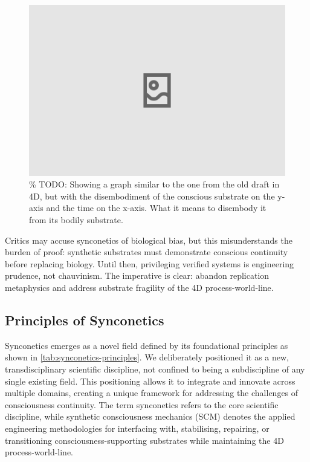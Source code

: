 \documentclass[10pt]{article}
\begin{document}
\begin{sloppypar}
  \begin{figure}[ht!]
    \centering
    \includegraphics[width=\textwidth]{figures/4d-trajectory-disembodiment.png}
    \caption{\% TODO: Showing a graph similar to the one from the old draft in 4D, but with the disembodiment of the conscious substrate on the y-axis and the time on the x-axis. What it means to disembody it from its bodily substrate.}
    \label{fig:4d-trajectory-disembodiment}
  \end{figure}

  Critics may accuse synconetics of biological bias, but this misunderstands the burden of proof: synthetic substrates must demonstrate conscious continuity before replacing biology. Until then, privileging verified systems is engineering prudence, not chauvinism. The imperative is clear: abandon replication metaphysics and address substrate fragility of the 4D process-world-line.

  \subsection{Principles of Synconetics}
  \label{sec:principles}

  Synconetics emerges as a novel field defined by its foundational principles as shown in \autoref{tab:synconetics-principles}. We deliberately positioned it as a new, transdisciplinary scientific discipline, not confined to being a subdiscipline of any single existing field. This positioning allows it to integrate and innovate across multiple domains, creating a unique framework for addressing the challenges of consciousness continuity. The term synconetics refers to the core scientific discipline, while synthetic consciousness mechanics (SCM) denotes the applied engineering methodologies for interfacing with, stabilising, repairing, or transitioning consciousness-supporting substrates while maintaining the 4D process-world-line.


\end{sloppypar}
\end{document}
